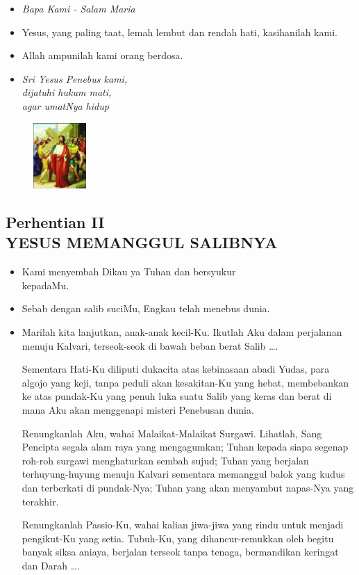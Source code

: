 \documentclass[a5paper,headsepline,titlepage,10pt,nnormalheadings,DIVcalc]{scrbook}
\newcommand{\BU}[1]{\begin{itemize} \item[U:] #1 \end{itemize}}
\newcommand{\BP}[1]{\begin{itemize} \item[P:] #1 \end{itemize}}
\newcommand{\kamiMenyembah}{\BP{ Kami menyembah Dikau ya Tuhan dan bersyukur\\kepadaMu.}
\BU{ Sebab dengan salib suciMu, Engkau telah menebus dunia.}
}
\newcommand{\kasihanilahKami}{\BP{Yesus, yang paling taat, lemah lembut dan rendah hati, kasihanilah kami.}
\BU{Allah ampunilah kami orang berdosa.}}
\begin{document}
\large\begin{itemize}\item[~]\it{Bapa Kami - Salam Maria}\end{itemize}\normalsize

\kasihanilahKami

\begin{itemize}
\item[2.] \it{Sri Yesus Penebus kami,\\ 
	dijatuhi hukum mati,\\ 
	agar umatNya hidup}
\end{itemize}



\begin{figure}
\includegraphics[width=2cm]{jalansalib_files/02_small.jpg}
\end{figure}
\subsection*{Perhentian II\\
YESUS MEMANGGUL SALIBNYA}


\kamiMenyembah
\BP{Marilah kita lanjutkan, anak-anak kecil-Ku. Ikutlah Aku dalam perjalanan menuju Kalvari, terseok-seok di bawah beban berat Salib \dots .

Sementara Hati-Ku diliputi dukacita atas kebinasaan abadi Yudas, para algojo yang keji, tanpa peduli akan kesakitan-Ku yang hebat, membebankan ke atas pundak-Ku yang penuh luka suatu Salib yang keras dan berat di mana Aku akan menggenapi misteri Penebusan dunia.

Renungkanlah Aku, wahai Malaikat-Malaikat Surgawi. Lihatlah, Sang Pencipta segala alam raya yang mengagumkan; Tuhan kepada siapa segenap roh-roh surgawi menghaturkan sembah sujud; Tuhan yang berjalan terhuyung-huyung menuju Kalvari sementara memanggul balok yang kudus dan terberkati di pundak-Nya; Tuhan yang akan menyambut napas-Nya yang terakhir.

Renungkanlah Passio-Ku, wahai kalian jiwa-jiwa yang rindu untuk menjadi pengikut-Ku yang setia. Tubuh-Ku, yang dihancur-remukkan oleh begitu banyak siksa aniaya, berjalan terseok tanpa tenaga, bermandikan keringat dan Darah \dots . }
\end{document}
